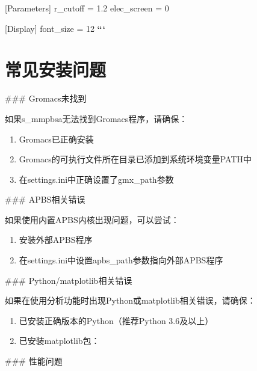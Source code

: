 \documentclass[letterpaper,10pt,english]{sphinxmanual}
\begin{document}
\sphinxAtStartPar
{[}Parameters{]}
r\_cutoff = 1.2
elec\_screen = 0

\sphinxAtStartPar
{[}Display{]}
font\_size = 12
{\color{red}\bfseries{}``}{\color{red}\bfseries{}`}


\section{常见安装问题}
\label{\detokenize{installation:id16}}
\sphinxAtStartPar
\#\#\# Gromacs未找到

\sphinxAtStartPar
如果s\_mmpbsa无法找到Gromacs程序，请确保：
\begin{enumerate}
%
\item {} 
\sphinxAtStartPar
Gromacs已正确安装

\item {} 
\sphinxAtStartPar
Gromacs的可执行文件所在目录已添加到系统环境变量PATH中

\item {} 
\sphinxAtStartPar
在settings.ini中正确设置了gmx\_path参数

\end{enumerate}

\sphinxAtStartPar
\#\#\# APBS相关错误

\sphinxAtStartPar
如果使用内置APBS内核出现问题，可以尝试：
\begin{enumerate}
%
\item {} 
\sphinxAtStartPar
安装外部APBS程序

\item {} 
\sphinxAtStartPar
在settings.ini中设置apbs\_path参数指向外部APBS程序

\end{enumerate}

\sphinxAtStartPar
\#\#\# Python/matplotlib相关错误

\sphinxAtStartPar
如果在使用分析功能时出现Python或matplotlib相关错误，请确保：
\begin{enumerate}
%
\item {} 
\sphinxAtStartPar
已安装正确版本的Python（推荐Python 3.6及以上）

\item {} 
\sphinxAtStartPar
已安装matplotlib包：

\end{enumerate}

\sphinxAtStartPar
\#\#\# 性能问题
\end{document}
